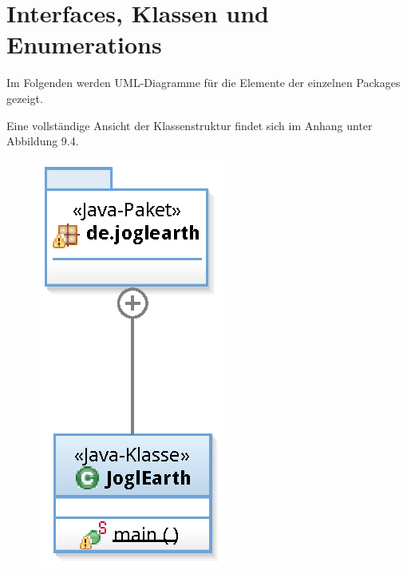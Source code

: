 \documentclass[10pt]{scrreprt}
\begin{document}
\newpage

\section{Interfaces, Klassen und Enumerations}

Im Folgenden werden UML-Diagramme für die Elemente der einzelnen Packages gezeigt.

Eine vollständige Ansicht der Klassenstruktur findet sich im Anhang unter Abbildung 9.4.

\vspace{2mm}

\begin{figure}[!htb]
	\centering
		\begin{minipage}[c]{3cm}
        \centering
			\includegraphics[scale=0.55]{de_joglearth.eps}
        \end{minipage}
        \hspace{2cm}
        \begin{minipage}[c]{6cm}
        \centering

\end{minipage}
\end{figure}
\end{document}
